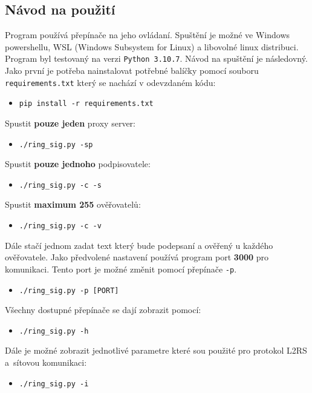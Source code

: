 \subsection{Návod na použití}
Program používá přepínače na jeho ovládaní. Spuštění je možné ve Windows powershellu, WSL (Windows Subsystem for Linux) a libovolné linux distribuci. Program byl testovaný na verzi \texttt{Python 3.10.7}. Návod na spuštění je následovný. Jako první je potřeba nainstalovat potřebné balíčky pomocí souboru \texttt{requirements.txt} který se nachází v odevzdaném kódu:
\begin{itemize}
  \item \texttt{pip install -r requirements.txt}
\end{itemize}
Spustit \textbf{pouze jeden} proxy server:
\begin{itemize}
  \item \texttt{./ring\_sig.py -sp}
\end{itemize}
Spustit \textbf{pouze jednoho} podpisovatele:
\begin{itemize}
  \item \texttt{./ring\_sig.py -c -s}
\end{itemize}
Spustit \textbf{maximum 255} ověřovatelů:
\begin{itemize}
  \item \texttt{./ring\_sig.py -c -v}
\end{itemize}
Dále stačí jednom zadat text který bude podepsaní a ověřený u každého ověřovatele. Jako předvolené nastavení používá program port \textbf{3000} pro komunikaci. Tento port je možné změnit pomocí přepínače \texttt{-p}.
\begin{itemize}
  \item \texttt{./ring\_sig.py -p [PORT]}
\end{itemize}
Všechny dostupné přepínače se dají zobrazit pomocí:
\begin{itemize}
  \item \texttt{./ring\_sig.py -h}
\end{itemize}
Dále je možné zobrazit jednotlivé parametre které sou použité pro protokol L2RS a~sítovou komunikaci:
\begin{itemize}
  \item \texttt{./ring\_sig.py -i}
\end{itemize}


